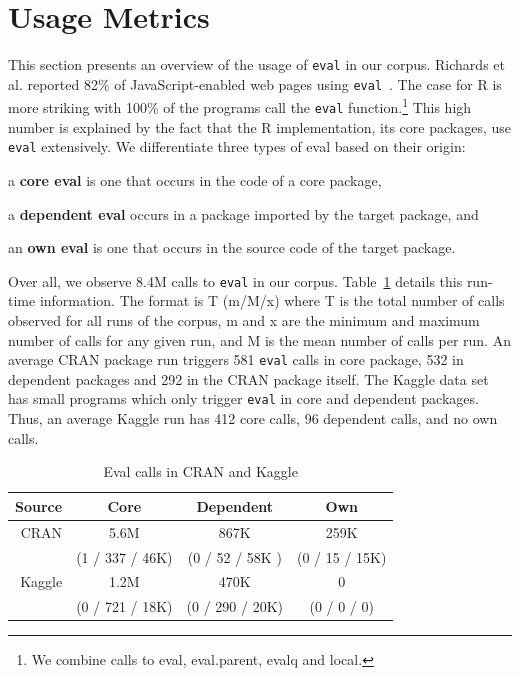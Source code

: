 \documentclass[USenglish,cleveref, autoref, thm-restate]{lipics-v2019}
\newcommand{\AllAllCallCountRnd}{8.4M\xspace}
\newcommand{\eval}{\texttt{eval}\xspace}
\begin{document}
\section{Usage Metrics}

This section presents an overview of the usage of \eval in our corpus. Richards
et al. reported 82\% of JavaScript-enabled web pages using \eval~\cite{ecoop11}.
The case for R is more striking with 100\% of the programs call the \eval
function.\footnote{We combine calls to {\sf eval}, {\sf eval.parent}, {\sf
    evalq} and {\sf local}.} This high number is explained by the fact that the
R implementation, its core packages, use \eval extensively. We differentiate
three types of eval based on their origin:
%
\begin{compactitem}[$-$]
  \item a {\bf core eval} is one that occurs in the code of a core package,
  \item a {\bf dependent eval} occurs in a package imported by the target
  package, and
  \item an {\bf own eval} is one that occurs in the source code of the target
  package.
\end{compactitem}

Over all, we observe \AllAllCallCountRnd calls to \eval in our corpus.
Table~\ref{A} details this run-time information. The format is T (m/M/x)
where T is the total number of calls observed for all runs of the corpus, m
and x are the minimum and maximum number of calls for any given run, and M
is the mean number of calls per run. An average CRAN package run triggers
581 {\eval} calls in core package, 532 in dependent packages and 292 in the
CRAN package itself.  The Kaggle data set has small programs which only
trigger \eval in core and dependent packages. Thus, an average Kaggle run
has 412 core calls, 96 dependent calls, and no own calls.


\begin{table}[!h] \centering
 \begin{tabular}{r|c|c|c} \hline
Source & Core    & Dependent                      & Own \\\hline
CRAN   & 5.6M &  867K    & 259K \\
       & (1 / 337 / 46K)& (0 / 52 / 58K ) & (0 / 15 / 15K) \\\hline
Kaggle &  1.2M &  470K   & 0\\
 &  (0 / 721 / 18K) & (0 / 290 / 20K) & (0 / 0 / 0)\\\hline
\end{tabular}\caption{Eval calls in CRAN and Kaggle}\label{A}\end{table}
\end{document}
